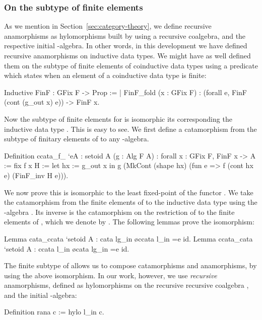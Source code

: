 \documentclass[a4paper,anonymous, UKenglish,cleveref, autoref, thm-restate]{lipics-v2021}
\begin{document}
\subsubsection{On the subtype of finite elements}
As we mention in
Section~\ref{sec:category-theory}, we define recursive anamorphisms as
hylomorphisms built by using a recursive coalgebra, and the respective
initial -algebra.
In other words, in this development we have defined recursive anamorphisms on
inductive data types.  We might have as well defined them on the subtype of
finite elements of coinductive data types using a predicate which states when an
element of a coinductive data type is finite:
\begin{coqcode}
Inductive FinF : GFix F -> Prop :=
| FinF_fold (x : GFix F) : (forall e, FinF (cont (g_out x) e)) -> FinF x.
\end{coqcode}
Now the subtype  of finite elements for 
is isomorphic its corresponding the inductive data type . This is
easy to see. We first define a catamorphism  from the
subtype  of finitary elements of  to
any -algebra.
\begin{coqcode}
Definition ccata_f_ `{eA : setoid A} (g : Alg F A)
  : forall x : GFix F, FinF x -> A := fix f x H :=
    let hx := g_out x in
      g (MkCont (shape hx) (fun e => f (cont hx e) (FinF_inv H e))).
\end{coqcode}
We now prove this is isomorphic to the least fixed-point of the functor
.
We take the catamorphism from the finite elements of  to the
inductive data type  using the -algebra . Its
inverse is the catamorphism on the restriction of  to the finite
elements of , which we denote by .  The following lemmas
prove the isomorphism:
\begin{coqcode}
Lemma cata_ccata `{setoid A} : cata lg_in \o ccata l_in =e id.
Lemma ccata_cata `{setoid A} : ccata l_in \o cata lg_in =e id.
\end{coqcode}
The finite subtype of  allows us to compose
catamorphisms and anamorphisms, by using the above isomorphism. In our work,
however, we use \emph{recursive} anamorphisms, defined as hylomorphisms on the
recursive recursive coalgebra , and the initial -algebra:
\begin{coqcode}
Definition rana c := hylo l_in c.
\end{coqcode}
\end{document}
